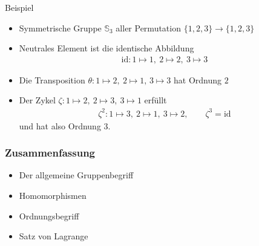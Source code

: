 \documentclass{beamer}
\renewcommand\SS{\mathbb S}
\newcommand{\id}{\mathrm{id}}
\newcommand{\ue}{\"u}
\begin{document}
\begin{frame}
\begin{overprint}
		\begin{block}{Beispiel}
			\begin{itemize}
				\item Symmetrische Gruppe $\SS_3$ aller Permutation $\{1,2,3\}\to\{1,2,3\}$
				\item Neutrales Element ist die identische Abbildung
					\begin{align*}
					\id:1\mapsto 1,\ 2\mapsto2,\ 3\mapsto3
					\end{align*}
				\item Die Transposition $\theta: 1\mapsto 2,\ 2\mapsto 1,\, 3\mapsto 3 $
					hat Ordnung $2$
				\item Der Zykel $ \zeta:1\mapsto 2,\ 2\mapsto 3,\ 3\mapsto 1 $
					erf\ue llt
					\begin{align*}
					\zeta^2:1\mapsto 3,\ 2\mapsto 1,\ 3\mapsto 2,\qquad \zeta^3=\id
					\end{align*}
					und hat also Ordnung 3.
			\end{itemize}	
		\end{block}
	\end{overprint}
\end{frame}

\begin{frame}\frametitle{Zusammenfassung}
\begin{itemize}
\item Der allgemeine Gruppenbegriff
\item Homomorphismen 
\item Ordnungsbegriff
\item Satz von Lagrange
\end{itemize}
\end{frame}
\end{document}
